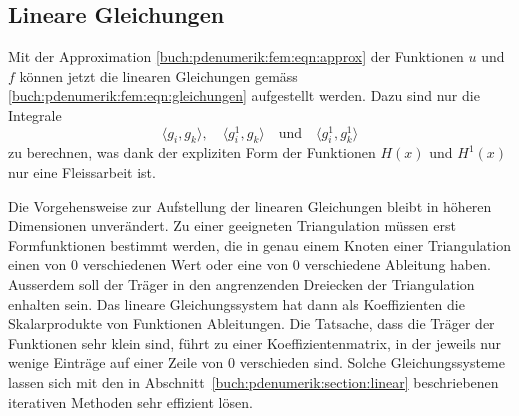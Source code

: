 %
%
\subsection{Lineare Gleichungen}
Mit der Approximation \eqref{buch:pdenumerik:fem:eqn:approx} der
Funktionen $u$ und $f$ können jetzt die linearen Gleichungen 
gemäss \eqref{buch:pdenumerik:fem:eqn:gleichungen} aufgestellt werden.
Dazu sind nur die Integrale
\[
\langle g_i,g_k\rangle,\quad
\langle g^1_i,g_k\rangle
\quad \text{und}\quad
\langle g^1_i,g^1_k\rangle
\]
zu berechnen, was dank der expliziten Form der Funktionen $H(x)$ und
$H^1(x)$ nur eine Fleissarbeit ist.

Die Vorgehensweise zur Aufstellung der linearen Gleichungen bleibt
in höheren Dimensionen unverändert.
Zu einer geeigneten Triangulation müssen erst Formfunktionen bestimmt
werden, die in genau einem Knoten einer Triangulation einen von 0
verschiedenen Wert oder eine von 0 verschiedene Ableitung haben.
Ausserdem soll der Träger in den angrenzenden Dreiecken der Triangulation
enhalten sein.
Das lineare Gleichungssystem hat dann als Koeffizienten die Skalarprodukte
von Funktionen Ableitungen.
Die Tatsache, dass die Träger der Funktionen sehr klein sind, führt
zu einer Koeffizientenmatrix, in der jeweils nur wenige Einträge
auf einer Zeile von 0 verschieden sind.
Solche Gleichungssysteme lassen sich mit den in
Abschnitt~\ref{buch:pdenumerik:section:linear} beschriebenen
iterativen Methoden sehr effizient lösen.

